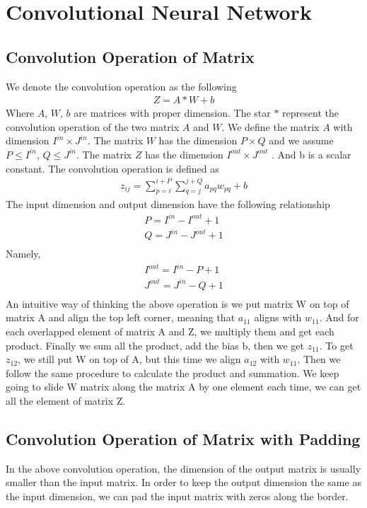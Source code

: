 \documentclass[a4paper]{article}
\begin{document}
\section{Convolutional Neural Network}
\subsection{Convolution Operation of Matrix}
We denote the convolution operation as the following
\begin{align*}
	Z= A*W +b
\end{align*}
Where $A$, $W$, $b$ are matrices with proper dimension. The star $*$ represent the convolution operation of the two matrix $A$ and $W$. We define the matrix $A$ with dimension $I^{in} \times J^{in}$. The matrix $W$ has the dimension $P \times Q$ and we assume $P \leq I^{in}$, $Q \leq J^{in}$. The matrix $Z$ has the dimension $I^{out} \times J^{out}$ . And b is a scalar constant. The convolution operation is defined as 
\begin{align*}
	z_{ij} = \sum_{p=i}^{i+P} \sum_{q=j}^{j+Q}  a_{pq} w_{pq} + b
\end{align*}
The input dimension and output dimension have the following relationship
\begin{align*}
	P  = I^{in} - I^{out} + 1 \\
	Q =  J^{in} - J^{out} + 1 \\
\end{align*}
Namely,
\begin{align*}
	I^{out}  = I^{in} - P  + 1 \\
	J^{out}  = J^{in} - Q  + 1 \\
\end{align*}
An intuitive way of thinking the above operation is we put matrix W on top of matrix A and align the top left corner, meaning that $a_{11}$ aligns with $w_{11}$. And for each overlapped element of matrix A and Z, we multiply them and get each product. Finally we sum all the product, add the bias b, then we get $z_{11}$. To get $z_{12}$, we still put W on top of A, but this time we align $a_{12}$ with $w_{11}$. Then we follow the same procedure to calculate the product and summation. We keep going to slide W matrix along the matrix A by one element each time, we can get all the element of matrix Z.
\subsection{Convolution Operation of Matrix with Padding}
In the above convolution operation, the dimension of the output matrix is usually smaller than the input matrix. In order to keep the output dimension the same as the input dimension, we can pad the input matrix with zeros along the border.
\end{document}
